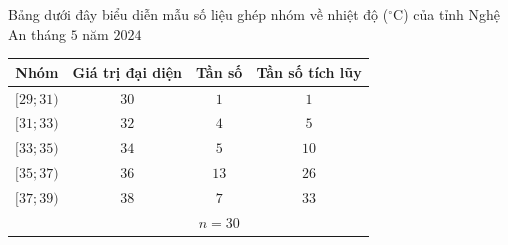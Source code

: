 \begin{ex}%
	Bảng dưới đây biểu diễn mẫu số liệu ghép nhóm về nhiệt độ ($^{\circ} \mathrm{C}$) của tỉnh Nghệ An tháng $5$ năm $2024$
	\begin{center}
		\begin{tabular}{|c|c|c|c|}
			\hline Nhóm & Giá trị đại diện & Tần số & Tần số tích lũy \\
			\hline$[29 ; 31)$ & $30$ & $1$ & $1$ \\
			\hline$[31 ; 33)$ & $32$ & $4$ & $5$ \\
			\hline$[33 ; 35)$ & $34$ & $5$ & $10$ \\
			\hline$[35 ; 37)$ & $36$ & $13$ & $26$ \\
			\hline$[37 ; 39)$ & $38$ & $7$ & $33$\\
			\hline & & $n=30$ &  \\
			\hline
		\end{tabular}
	\end{center}
	

\end{ex}
